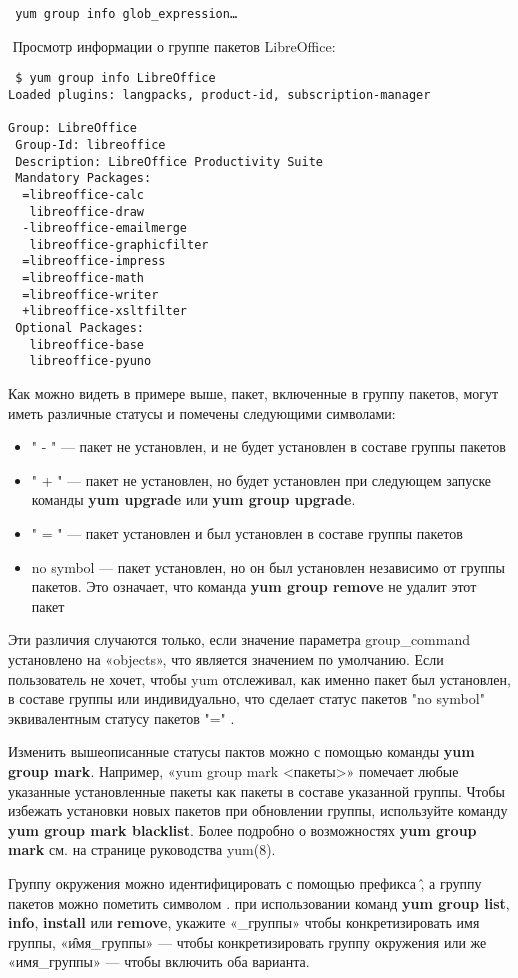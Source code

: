 \documentclass[a4paper,10pt,twoside]{article}
\begin{document}
\begin{verbatim}
 yum group info glob_expression…
\end{verbatim} 
⁠
Просмотр информации о группе пакетов LibreOffice: 
\begin{verbatim}
 $ yum group info LibreOffice
Loaded plugins: langpacks, product-id, subscription-manager

Group: LibreOffice
 Group-Id: libreoffice
 Description: LibreOffice Productivity Suite
 Mandatory Packages:
  =libreoffice-calc
   libreoffice-draw
  -libreoffice-emailmerge
   libreoffice-graphicfilter
  =libreoffice-impress
  =libreoffice-math
  =libreoffice-writer
  +libreoffice-xsltfilter
 Optional Packages:
   libreoffice-base
   libreoffice-pyuno
\end{verbatim} 


Как можно видеть в примере выше, пакет, включенные в группу пакетов, могут иметь различные статусы и помечены следующими символами:
\begin{itemize}
 \item " - " — пакет не установлен, и не будет установлен в составе группы пакетов
\item " + " — пакет не установлен, но будет установлен при следующем запуске команды \textbf{yum upgrade} или \textbf{yum group upgrade}.
\item " = " — пакет установлен и был установлен в составе группы пакетов
\item no symbol — пакет установлен, но он был установлен независимо от группы пакетов. Это означает, что команда \textbf{yum group remove} не удалит этот пакет
\end{itemize}

Эти различия случаются только, если значение параметра group\_command установлено на «objects», что является значением по умолчанию. Если пользователь не хочет, чтобы yum отслеживал, как именно пакет был установлен, в составе группы или индивидуально, что сделает статус пакетов "no symbol" эквивалентным статусу пакетов "=" .

Изменить вышеописанные статусы пактов можно с помощью команды \textbf{yum group mark}. Например, «yum group mark <пакеты>» помечает любые указанные установленные пакеты как пакеты в составе указанной группы. Чтобы избежать установки новых пакетов при обновлении группы, используйте команду \textbf{yum group mark blacklist}. Более подробно о возможностях \textbf{yum group mark} см. на странице руководства yum(8).

Группу окружения можно идентифицировать с помощью префикса \@\^ , а группу пакетов можно пометить символом \@.  при использовании команд \textbf{yum group list}, \textbf{info}, \textbf{install} или \textbf{remove}, укажите «\_группы» чтобы конкретизировать имя группы, «\@\^имя\_группы» — чтобы конкретизировать группу окружения или же «имя\_группы» — чтобы включить оба варианта.
\end{document}
